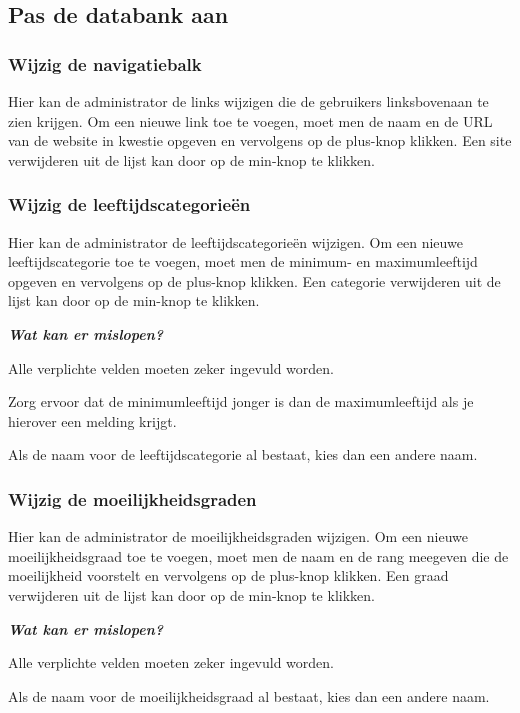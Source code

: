 \documentclass[]{article}
\begin{document}
\subsection{Pas de databank aan}

\subsubsection{Wijzig de navigatiebalk}
Hier kan de administrator de links wijzigen die de gebruikers linksbovenaan te zien krijgen. Om een nieuwe link toe te voegen, moet men de naam en de URL van de website in kwestie opgeven en vervolgens op de plus-knop klikken. Een site verwijderen uit de lijst kan door op de min-knop te klikken.

\subsubsection{Wijzig de leeftijdscategorieën}
Hier kan de administrator de leeftijdscategorieën wijzigen. Om een nieuwe leeftijdscategorie toe te voegen, moet men de minimum- en maximumleeftijd opgeven en vervolgens op de plus-knop klikken. Een categorie verwijderen uit de lijst kan door op de min-knop te klikken.

\textbf{\textit{Wat kan er mislopen?}}

Alle verplichte velden moeten zeker ingevuld worden.

Zorg ervoor dat de minimumleeftijd jonger is dan de maximumleeftijd als je hierover een melding krijgt.

Als de naam voor de leeftijdscategorie al bestaat, kies dan een andere naam.

\subsubsection{Wijzig de moeilijkheidsgraden}
Hier kan de administrator de moeilijkheidsgraden wijzigen. Om een nieuwe moeilijkheidsgraad toe te voegen, moet men de naam en de rang meegeven die de moeilijkheid voorstelt en vervolgens op de plus-knop klikken. Een graad verwijderen uit de lijst kan door op de min-knop te klikken.

\textbf{\textit{Wat kan er mislopen?}}

Alle verplichte velden moeten zeker ingevuld worden.

Als de naam voor de moeilijkheidsgraad al bestaat, kies dan een andere naam.
\end{document}
